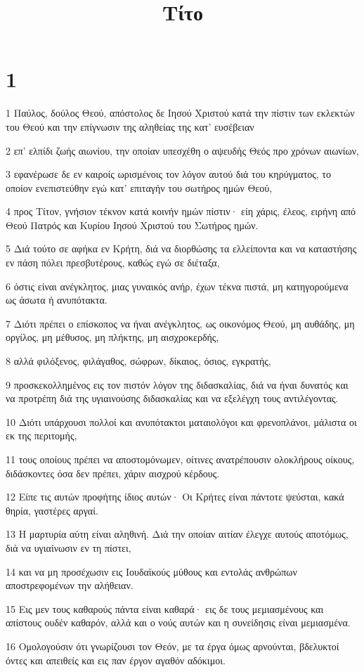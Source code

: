 

\title{Τίτο}


\chapter{1}

\par 1 Παύλος, δούλος Θεού, απόστολος δε Ιησού Χριστού κατά την πίστιν των εκλεκτών του Θεού και την επίγνωσιν της αληθείας της κατ' ευσέβειαν
\par 2 επ' ελπίδι ζωής αιωνίου, την οποίαν υπεσχέθη ο αψευδής Θεός προ χρόνων αιωνίων,
\par 3 εφανέρωσε δε εν καιροίς ωρισμένοις τον λόγον αυτού διά του κηρύγματος, το οποίον ενεπιστεύθην εγώ κατ' επιταγήν του σωτήρος ημών Θεού,
\par 4 προς Τίτον, γνήσιον τέκνον κατά κοινήν ημών πίστιν· είη χάρις, έλεος, ειρήνη από Θεού Πατρός και Κυρίου Ιησού Χριστού του Σωτήρος ημών.
\par 5 Διά τούτο σε αφήκα εν Κρήτη, διά να διορθώσης τα ελλείποντα και να καταστήσης εν πάση πόλει πρεσβυτέρους, καθώς εγώ σε διέταξα,
\par 6 όστις είναι ανέγκλητος, μιας γυναικός ανήρ, έχων τέκνα πιστά, μη κατηγορούμενα ως άσωτα ή ανυπότακτα.
\par 7 Διότι πρέπει ο επίσκοπος να ήναι ανέγκλητος, ως οικονόμος Θεού, μη αυθάδης, μη οργίλος, μη μέθυσος, μη πλήκτης, μη αισχροκερδής,
\par 8 αλλά φιλόξενος, φιλάγαθος, σώφρων, δίκαιος, όσιος, εγκρατής,
\par 9 προσκεκολλημένος εις τον πιστόν λόγον της διδασκαλίας, διά να ήναι δυνατός και να προτρέπη διά της υγιαινούσης διδασκαλίας και να εξελέγχη τους αντιλέγοντας.
\par 10 Διότι υπάρχουσι πολλοί και ανυπότακτοι ματαιολόγοι και φρενοπλάνοι, μάλιστα οι εκ της περιτομής,
\par 11 τους οποίους πρέπει να αποστομόνωμεν, οίτινες ανατρέπουσιν ολοκλήρους οίκους, διδάσκοντες όσα δεν πρέπει, χάριν αισχρού κέρδους.
\par 12 Είπε τις αυτών προφήτης ίδιος αυτών· Οι Κρήτες είναι πάντοτε ψεύσται, κακά θηρία, γαστέρες αργαί.
\par 13 Η μαρτυρία αύτη είναι αληθινή. Διά την οποίαν αιτίαν έλεγχε αυτούς αποτόμως, διά να υγιαίνωσιν εν τη πίστει,
\par 14 και να μη προσέχωσιν εις Ιουδαϊκούς μύθους και εντολάς ανθρώπων αποστρεφομένων την αλήθειαν.
\par 15 Εις μεν τους καθαρούς πάντα είναι καθαρά· εις δε τους μεμιασμένους και απίστους ουδέν καθαρόν, αλλά και ο νούς αυτών και η συνείδησις είναι μεμιασμένα.
\par 16 Ομολογούσιν ότι γνωρίζουσι τον Θεόν, με τα έργα όμως αρνούνται, βδελυκτοί όντες και απειθείς και εις παν έργον αγαθόν αδόκιμοι.

